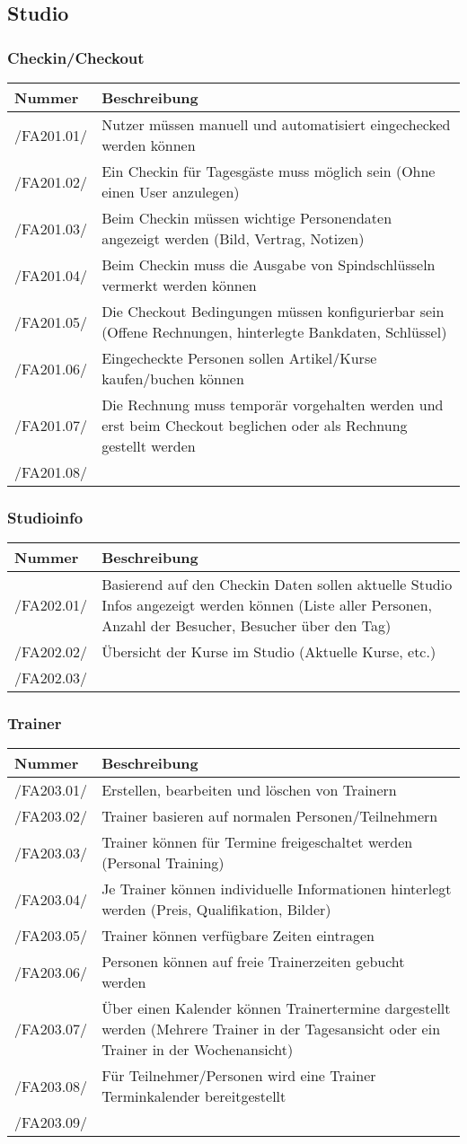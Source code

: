 \documentclass[a4paper,11pt]{article}
\newcommand\addrow[2]{#1 &#2\\ }
\newcommand\addheading[2]{#1 &#2\\ \hline}
\newcommand\tabularhead{\begin{tabular}{lp{13cm}}
\hline
}
\newenvironment{usecase}{\tabularhead}
{\hline\end{tabular}}
\begin{document}
\subsection{Studio}
\subsubsection{Checkin/Checkout}
\begin{usecase}
  \addheading{Nummer}{Beschreibung} 
  \addrow{/FA201.01/}{Nutzer müssen manuell und automatisiert eingechecked werden können}
  \addrow{/FA201.02/}{Ein Checkin für Tagesgäste muss möglich sein (Ohne einen User anzulegen)}
  \addrow{/FA201.03/}{Beim Checkin müssen wichtige Personendaten angezeigt werden (Bild, Vertrag, Notizen)}
  \addrow{/FA201.04/}{Beim Checkin muss die Ausgabe von Spindschlüsseln vermerkt werden können}
  \addrow{/FA201.05/}{Die Checkout Bedingungen müssen konfigurierbar sein (Offene Rechnungen, hinterlegte Bankdaten, Schlüssel)}
  \addrow{/FA201.06/}{Eingecheckte Personen sollen Artikel/Kurse kaufen/buchen können}
  \addrow{/FA201.07/}{Die Rechnung muss temporär vorgehalten werden und erst beim Checkout beglichen oder als Rechnung gestellt werden}
  \addrow{/FA201.08/}{}
\end{usecase}

\subsubsection{Studioinfo}
\begin{usecase}
  \addheading{Nummer}{Beschreibung} 
  \addrow{/FA202.01/}{Basierend auf den Checkin Daten sollen aktuelle Studio Infos angezeigt werden können (Liste aller Personen, Anzahl der Besucher, Besucher über den Tag)}
  \addrow{/FA202.02/}{Übersicht der Kurse im Studio (Aktuelle Kurse, etc.)}
  \addrow{/FA202.03/}{}
\end{usecase}

\subsubsection{Trainer}
\begin{usecase}
  \addheading{Nummer}{Beschreibung} 
  \addrow{/FA203.01/}{Erstellen, bearbeiten und löschen von Trainern}
  \addrow{/FA203.02/}{Trainer basieren auf normalen Personen/Teilnehmern}
  \addrow{/FA203.03/}{Trainer können für Termine freigeschaltet werden (Personal Training)}
  \addrow{/FA203.04/}{Je Trainer können individuelle Informationen hinterlegt werden (Preis, Qualifikation, Bilder)}
  \addrow{/FA203.05/}{Trainer können verfügbare Zeiten eintragen}
  \addrow{/FA203.06/}{Personen können auf freie Trainerzeiten gebucht werden}
  \addrow{/FA203.07/}{Über einen Kalender können Trainertermine dargestellt werden (Mehrere Trainer in der Tagesansicht oder ein Trainer in der Wochenansicht)}
  \addrow{/FA203.08/}{Für Teilnehmer/Personen wird eine Trainer Terminkalender bereitgestellt}
  \addrow{/FA203.09/}{}
\end{usecase}
\end{document}
